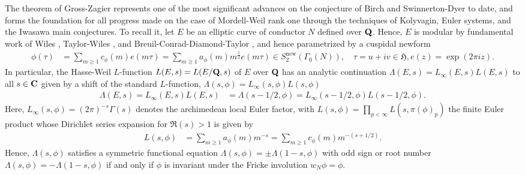 \documentclass{amsart}
\theoremstyle{definition}
\theoremstyle{definition}
\theoremstyle{definition}
\begin{document}
The theorem of Gross-Zagier \cite[Theorem $\S$I (6.3)]{GZ} represents one of the most significant advances on the conjecture of Birch and Swinnerton-Dyer to date, 
and forms the foundation for all progress made on the case of Mordell-Weil rank one through the techniques of Kolyvagin, Euler systems, and the Iwasawa main conjectures. 
To recall it, let $E$ be an elliptic curve of conductor $N$ defined over ${\bf{Q}}$. 
Hence, $E$ is modular by fundamental work of Wiles \cite{Wi}, Taylor-Wiles \cite{TW}, 
and Breuil-Conrad-Diamond-Taylor \cite{BCDT}, and hence parametrized by a cuspidal newform 
\begin{align*} \phi(\tau) &= \sum\limits_{m \geq 1} c_{\phi}(m) e(m \tau) = \sum\limits_{m \geq 1} a_{\phi}(m) m^{\frac{1}{2}} e(m \tau) 
\in S^{\operatorname{new}}_2(\Gamma_0(N)), \quad \tau = u + iv \in \mathfrak{H}, e(z) = \exp(2 \pi i z). \end{align*} 
In particular, the Hasse-Weil $L$-function $L(E, s) = L(E/{\bf{Q}},s)$ of $E$ over ${\bf{Q}}$ has an analytic continuation 
$\Lambda(E, s) = L_{\infty}(E, s) L(E, s)$ to all $s \in {\bf{C}}$ given by a shift of the standard $L$-function, $\Lambda(s, \phi)= L_{\infty}(s, \phi)L (s, \phi)$
\begin{align*} \Lambda(E, s) = L_{\infty}(E, s) L(E, s) &= \Lambda(s-1/2, \phi) = L_{\infty}(s- 1/2, \phi) L(s-1/2, \phi). \end{align*}
Here, $L_{\infty}(s, \phi) = (2 \pi)^{-s} \Gamma(s)$ denotes the archimedean local Euler factor, 
with $L(s, \phi) = \prod_{p < \infty} L(s, \pi(\phi)_p)$ the finite Euler product whose Dirichlet series expansion for $\Re(s) >1$ is given by
\begin{align*} L(s, \phi) &= \sum\limits_{m \geq 1} a_{\phi}(m) m^{-s}  = \sum\limits_{m \geq 1} c_{\phi}(m) m^{-(s + 1/2)}. \end{align*}
Hence, $\Lambda(s, \phi)$ satisfies a symmetric functional equation $\Lambda(s, \phi) = \pm \Lambda(1-s, \phi)$
with odd sign or root number $\Lambda(s, \phi) = - \Lambda(1-s, \phi)$ if and only if $\phi$ is invariant under the Fricke involution $w_N \phi = \phi$.
\end{document}
